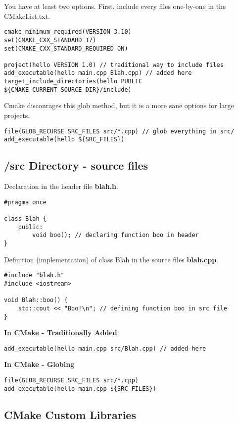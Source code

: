 You have at least two options. First, include every files one-by-one in the CMakeList.txt.
\begin{verbatim}
cmake_minimum_required(VERSION 3.10)
set(CMAKE_CXX_STANDARD 17)
set(CMAKE_CXX_STANDARD_REQUIRED ON)

project(hello VERSION 1.0) // traditional way to include files
add_executable(hello main.cpp Blah.cpp) // added here
target_include_directories(hello PUBLIC ${CMAKE_CURRENT_SOURCE_DIR}/include)
\end{verbatim}

Cmake discourages this glob method, but it is a more sane options for large projects.

\begin{verbatim}
file(GLOB_RECURSE SRC_FILES src/*.cpp) // glob everything in src/
add_executable(hello ${SRC_FILES})
\end{verbatim}

\subsection{/src Directory - source files}

Declaration in the header file \textbf{blah.h}.
\begin{verbatim}
#pragma once

class Blah {
    public:
        void boo(); // declaring function boo in header
}
\end{verbatim}

Definition (implementation) of class Blah in the source files \textbf{blah.cpp}.
\begin{verbatim}
#include "blah.h"
#include <iostream>

void Blah::boo() {
    std::cout << "Boo!\n"; // defining function boo in src file
}
\end{verbatim}

\textbf{In CMake - Traditionally Added}
\begin{verbatim}
add_executable(hello main.cpp src/Blah.cpp) // added here
\end{verbatim}

\textbf{In CMake - Globing}
\begin{verbatim}
file(GLOB_RECURSE SRC_FILES src/*.cpp)
add_executable(hello main.cpp ${SRC_FILES})
\end{verbatim}

\subsection{CMake Custom Libraries}

